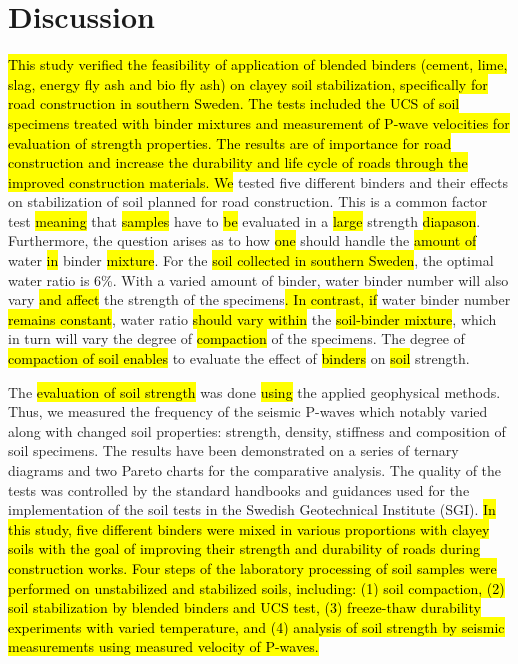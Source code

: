 \documentclass[constrmater,article,submit,pdftex,moreauthors]{Definitions/mdpi}
\begin{document}
\section{Discussion}

\hl{This study verified the feasibility of application of blended binders (cement,  lime, slag, energy fly ash and bio fly ash) on clayey soil stabilization, specifically for road construction in southern Sweden. The tests included the UCS of soil specimens treated with binder mixtures and measurement of P-wave velocities for evaluation of strength properties. The results are of importance for road construction and increase the durability and life cycle of roads through the improved construction materials. We} tested five different binders and their effects on stabilization of soil planned for road construction. This is a common factor test \hl{meaning} that \hl{samples } have to \hl{be }evaluated in a \hl{large} strength \hl{diapason}. Furthermore, the question arises as to how \hl{one} should handle the \hl{amount of }water \hl{in }binder \hl{mixture}. For the \hl{soil collected in southern Sweden}, the optimal water ratio is 6\%. With a varied amount of binder, water binder number will also vary \hl{and affect} the strength of the specimens\hl{. In contrast, if} water binder number \hl{remains constant}, water ratio \hl{should vary within } the \hl{soil-binder mixture}, which in turn will vary the degree of \hl{compaction} of the specimens. The degree of \hl{compaction of soil enables} to evaluate the effect of \hl{binders} on \hl{soil} strength.

The \hl{evaluation of soil strength} was done \hl{using} the applied geophysical methods. Thus, we measured the frequency of the seismic P-waves which notably varied along with changed soil properties: strength, density, stiffness and composition of soil specimens. The results have been demonstrated on a series of ternary diagrams and two Pareto charts for the comparative analysis. The quality of the tests was controlled by the standard handbooks and guidances used for the implementation of the soil tests in the Swedish Geotechnical Institute (SGI). \hl{In this study, five different binders were mixed in various proportions with clayey soils with the goal of improving their strength and durability of roads during construction works. Four steps of the laboratory processing of soil samples were performed on unstabilized and stabilized soils, including: (1) soil compaction, (2) soil stabilization by blended binders and UCS test, (3) freeze-thaw durability experiments with varied temperature, and (4)  analysis of soil strength by seismic measurements using measured velocity of P-waves.}
\end{document}
